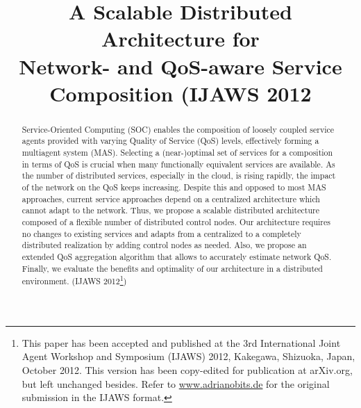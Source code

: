\documentclass[10pt, conference, compsocconf]{IEEEtran}
\begin{document}
\title{	A Scalable Distributed Architecture for\\Network- and QoS-aware Service Composition {\normalsize (IJAWS 2012} }

\author{
\and
\and
}

\maketitle 

\setcounter{footnote}{0} 

\begin{abstract} Service-Oriented Computing (SOC) enables the composition of loosely coupled service agents
	provided with varying Quality of Service (QoS) levels,
		effectively forming a multiagent system (MAS).
Selecting a (near-)optimal set of services for a composition in terms of QoS is crucial
	when many functionally equivalent services are available.
As the number of distributed services, especially in the cloud, is rising rapidly,
	the impact of the network on the QoS keeps increasing.
Despite this and opposed to most MAS approaches, current service approaches depend on a centralized architecture which cannot adapt to the network.
Thus, we propose a scalable distributed architecture composed of a flexible number of distributed control nodes.
Our architecture requires no changes to existing services and 
	adapts from a centralized to a completely distributed realization	by adding control nodes as needed.
Also, we propose an extended QoS aggregation algorithm that allows to accurately estimate network QoS.
Finally, we evaluate the benefits and optimality of our architecture in a distributed environment.
{\small (IJAWS 2012\footnote{\label{note1}This paper has been accepted and published at the 3rd International Joint Agent Workshop and Symposium (IJAWS) 2012, Kakegawa, Shizuoka, Japan, October 2012.
This version has been copy-edited for publication at arXiv.org, but left unchanged besides.
Refer to \url{www.adrianobits.de} for the original submission in the IJAWS format.})}
\end{abstract}
\end{document}
